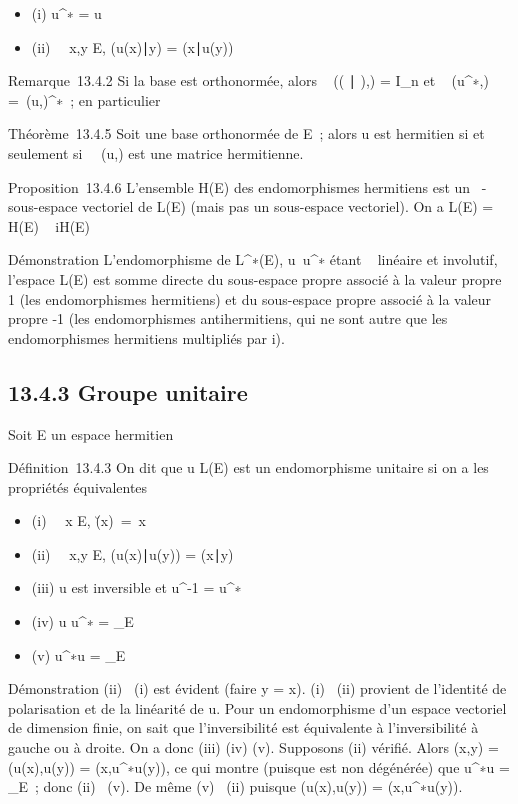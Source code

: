 \documentclass[]{article}
\begin{document}
\begin{itemize}
\itemsep1pt\parskip0pt
\item
  (i) u^∗ = u
\item
  (ii) \forall~~x,y \in E,
  (u(x)∣y) =
  (x∣u(y))
\end{itemize}

Remarque~13.4.2 Si la base  est orthonormée, alors
\mathrmMat~ ((
∣ ),) = I_n et
\mathrmMat~
(u^∗,) =\
\mathrmMat (u,)^∗~; en particulier

Théorème~13.4.5 Soit  une base orthonormée de E~; alors u est hermitien
si et seulement
si~\mathrmMat~ (u,) est une
matrice hermitienne.

Proposition~13.4.6 L'ensemble H(E) des endomorphismes hermitiens est un
\mathbb{R}~-sous-espace vectoriel de L(E) (mais pas un \mathbb{C} sous-espace vectoriel).
On a L(E) = H(E) \oplus~ iH(E)

Démonstration L'endomorphisme de L^∗(E),
u\mapsto~u^∗ étant ~ linéaire et
involutif, l'espace L(E) est somme directe du sous-espace propre associé
à la valeur propre 1 (les endomorphismes hermitiens) et du sous-espace
propre associé à la valeur propre -1 (les endomorphismes antihermitiens,
qui ne sont autre que les endomorphismes hermitiens multipliés par i).

\subsection{13.4.3 Groupe unitaire}

Soit E un espace hermitien

Définition~13.4.3 On dit que u \in L(E) est un endomorphisme unitaire si
on a les propriétés équivalentes

\begin{itemize}
\itemsep1pt\parskip0pt
\item
  (i) \forall~~x \in E,
  \u(x)\
  =\ x\
\item
  (ii) \forall~~x,y \in E,
  (u(x)∣u(y)) =
  (x∣y)
\item
  (iii) u est inversible et u^-1 = u^∗
\item
  (iv) u \cdot u^∗ = \mathrmId_E
\item
  (v) u^∗\cdot u = \mathrmId_E
\end{itemize}

Démonstration (ii) \rigtharrow~(i) est évident (faire y = x). (i) \rigtharrow~(ii) provient de
l'identité de polarisation et de la linéarité de u. Pour un
endomorphisme d'un espace vectoriel de dimension finie, on sait que
l'inversibilité est équivalente à l'inversibilité à gauche ou à droite.
On a donc (iii) \Leftrightarrow (iv)
\Leftrightarrow (v). Supposons (ii) vérifié. Alors \phi(x,y) =
\phi(u(x),u(y)) = \phi(x,u^∗\cdot u(y)), ce qui montre (puisque \phi est
non dégénérée) que u^∗\cdot u =
\mathrmId_E~; donc (ii) \rigtharrow~(v). De même (v)
\rigtharrow~(ii) puisque \phi(u(x),u(y)) = \phi(x,u^∗\cdot u(y)).
\end{document}
